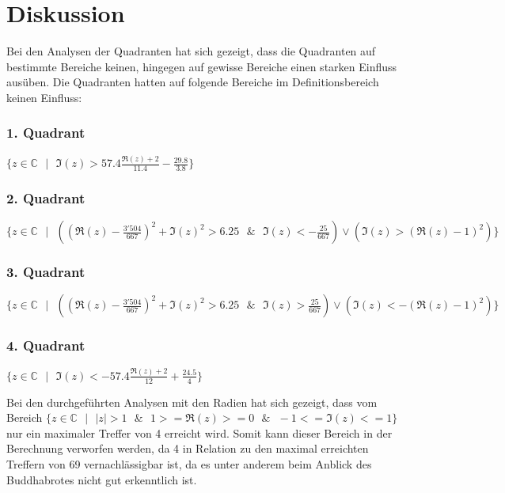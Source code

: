 \section{Diskussion}
Bei den Analysen der Quadranten hat sich gezeigt, dass die Quadranten auf bestimmte Bereiche keinen, hingegen auf gewisse Bereiche einen starken Einfluss ausüben. Die Quadranten hatten auf folgende Bereiche im Definitionsbereich keinen Einfluss:
\begin{center}
\subsubsection*{1. Quadrant}
$\{z \in \mathbb{C}\text{ }|\text{ }\Im(z)>57.4\frac{\Re(z)+2}{11.4}-\frac{29.8}{3.8}\}$
\subsubsection*{2. Quadrant}
$\{z \in \mathbb{C}\text{ }|\text{ }((\Re(z)-\frac{3'504}{667})^2+\Im(z)^2>6.25 \text{ }\&\text{ } \Im(z) < -\frac{25}{667}) \lor (\Im(z)>(\Re(z)-1)^2) \}$
\subsubsection*{3. Quadrant}
$\{z \in \mathbb{C}\text{ }|\text{ }((\Re(z)-\frac{3'504}{667})^2+\Im(z)^2>6.25 \text{ }\&\text{ } \Im(z) > \frac{25}{667}) \lor (\Im(z)<-(\Re(z)-1)^2) \}$
\subsubsection*{4. Quadrant}
$\{z \in \mathbb{C}\text{ }|\text{ }\Im(z)<-57.4\frac{\Re(z)+2}{12}+\frac{24.5}{4}\}$\\
\end{center}
Bei den durchgeführten Analysen mit den Radien hat sich gezeigt, dass vom Bereich $\{z \in \mathbb{C}\text{ }|\text{ } |z| >1\text{ } \& \text{ } 1>=\Re(z)>=0 \text{ } \& \text{ }-1<=\Im(z)<=1\}$ nur ein maximaler Treffer von 4 erreicht wird. Somit kann dieser Bereich in der Berechnung verworfen werden, da 4 in Relation zu den maximal erreichten Treffern von 69 vernachlässigbar ist, da es unter anderem beim Anblick des Buddhabrotes nicht gut erkenntlich ist.